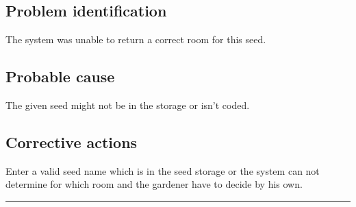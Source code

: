 \subsection{Problem identification}
The system was unable to return a correct room for this seed.

\subsection{Probable cause}
The given seed might not be in the storage or isn't coded.

\subsection{Corrective actions}
Enter a valid seed name which is in the seed storage or the system can
not determine for which room and the gardener have to decide by his own.
\vspace{0.5cm}
\hrule
\hfill

